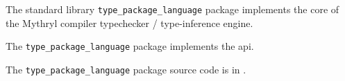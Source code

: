 
The standard library {\tt type\_package\_language} package implements the core of the Mythryl compiler typechecker / type-inference engine.

The {\tt type\_package\_language} package implements the  api.

The {\tt type\_package\_language} package source code is in .

